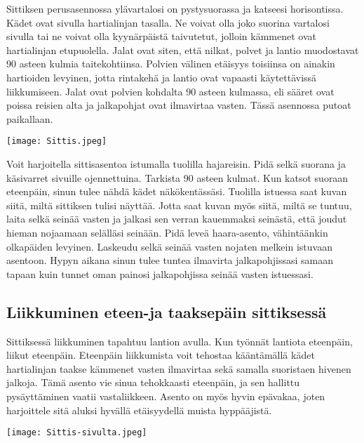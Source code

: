 Sittiksen perusasennossa ylävartalosi on pystysuorassa ja katseesi horisontissa. Kädet ovat sivulla hartialinjan tasalla. Ne voivat olla joko suorina vartalosi sivulla tai ne voivat olla kyynärpäistä taivutetut, jolloin kämmenet ovat hartialinjan etupuolella. Jalat ovat siten, että nilkat, polvet ja lantio muodostavat 90 asteen kulmia taitekohtiinsa. Polvien välinen etäisyys toisiinsa on ainakin hartioiden levyinen, jotta rintakehä ja lantio ovat vapaasti käytettävissä liikkumiseen. Jalat ovat polvien kohdalta 90 asteen kulmassa, eli sääret ovat poissa reisien alta ja jalkapohjat ovat ilmavirtaa vasten. Tässä asennossa putoat paikallaan. 


\begin{Figure}\centering\texttt{[image: Sittis.jpeg]}\end{Figure} 


Voit harjoitella sittisasentoa istumalla tuolilla hajareisin. Pidä selkä suorana ja käsivarret sivuille ojennettuina. Tarkista 90 asteen kulmat. Kun katsot suoraan eteenpäin, sinun tulee nähdä kädet näkökentässäsi. Tuolilla istuessa saat kuvan siitä, miltä sittiksen tulisi näyttää. Jotta saat kuvan myös siitä, miltä se tuntuu, laita selkä seinää vasten ja jalkasi sen verran kauemmaksi seinästä, että joudut hieman nojaamaan selälläsi seinään. Pidä leveä haara-asento, vähintäänkin olkapäiden levyinen. Laskeudu selkä seinää vasten nojaten melkein istuvaan asentoon. Hypyn aikana sinun tulee tuntea ilmavirta jalkapohjissasi samaan tapaan kuin tunnet oman painosi jalkapohjissa seinää vasten istuessasi. 

\subsection{ Liikkuminen  eteen-ja taaksepäin sittiksessä }
\label{freefly-lentoasennot-liikkuminen-eteen-ja-taaksepain-sittiksessa}


Sittiksessä liikkuminen tapahtuu lantion avulla. Kun työnnät lantiota eteenpäin, liikut eteenpäin. Eteenpäin liikkumista voit tehostaa kääntämällä kädet hartialinjan taakse kämmenet vasten ilmavirtaa sekä samalla suoristaen hivenen jalkoja. Tämä asento vie sinua tehokkaasti eteenpäin, ja sen hallittu pysäyttäminen vaatii vastaliikkeen. Asento on myös hyvin epävakaa, joten harjoittele sitä aluksi hyvällä etäisyydellä muista hyppääjistä. 


\begin{Figure}\centering\texttt{[image: Sittis-sivulta.jpeg]}\end{Figure} 


